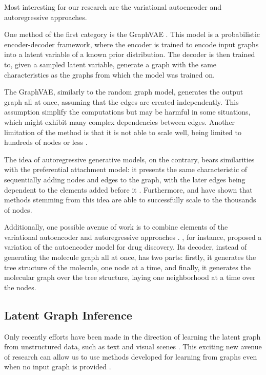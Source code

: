 \documentclass[12pt,a4paper]{article}
\begin{document}
	Most interesting for our research are the variational autoencoder \citep{KipfandWelling2016, SimonovskyandKomodakis2018} and autoregressive \citep{Li2018, You2018, Liao2019} approaches.
	
	One method of the first category is the GraphVAE \citep{SimonovskyandKomodakis2018}. This model is a probabilistic encoder-decoder framework, where the encoder is trained to encode input graphs into a latent variable of a known prior distribution. The decoder is then trained to, given a sampled latent variable, generate a graph with the same characteristics as the graphs from which the model was trained on.
	
	The GraphVAE, similarly to the random graph model, generates the output graph all at once, assuming that the edges are created independently. This assumption simplify the computations but may be harmful in some situations, which might exhibit many complex dependencies between edges. Another limitation of the method is that it is not able to scale well, being limited to hundreds of nodes or less  \citep{Hamilton2020}.
	
	The idea of autoregressive generative models, on the contrary, bears similarities with the preferential attachment model: it presents the same characteristic of sequentially adding nodes and edges to the graph, with the later edges being dependent to the elements added before it \citep{Li2018, You2018, Liao2019}. Furthermore, \textcite{You2018} and \textcite{Liao2019} have shown that methods stemming from this idea are able to successfully scale to the thousands of nodes.
	
	Additionally, one possible avenue of work is to combine elements of the variational autoencoder and autoregressive approaches \citep{Hamilton2020}. \textcite{Jin2018}, for instance, proposed a variation of the autoencoder model for drug discovery. Its decoder, instead of generating the molecule graph all at once, has two parts: firstly, it generates the tree structure of the molecule, one node at a time, and finally, it generates the molecular graph over the tree structure, laying one neighborhood at a time over the nodes.
	
	\subsection{Latent Graph Inference}
	\label{sec:latent_graph_inference}
	
	Only recently efforts have been made in the direction of learning the latent graph from unstructured data, such as text and visual scenes \citep{Vaswani2017, Wang2018, Watters2017, VanSteenkiste2018, KipfNRI2018}. This exciting new avenue of research can allow us to use methods developed for learning from graphs even when no input graph is provided \citep{Hamilton2020}.
	
\end{document}
